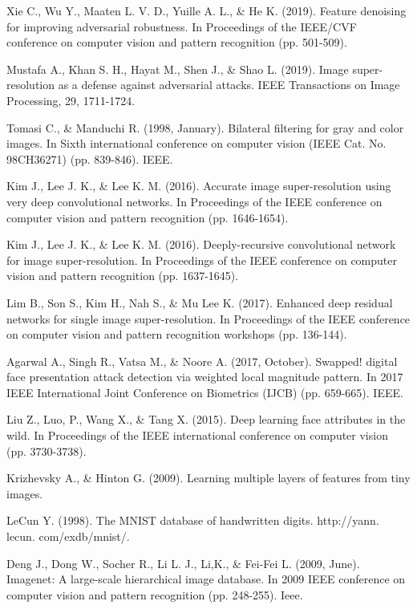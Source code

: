 \begin{thebibliography}{}
Xie C., Wu Y., Maaten L. V. D., Yuille A. L., \& He K. (2019). Feature denoising for improving adversarial robustness. In Proceedings of the IEEE/CVF conference on computer vision and pattern recognition (pp. 501-509).

Mustafa A., Khan S. H., Hayat M., Shen J., \& Shao L. (2019). Image super-resolution as a defense against adversarial attacks. IEEE Transactions on Image Processing, 29, 1711-1724.

Tomasi C., \& Manduchi R. (1998, January). Bilateral filtering for gray and color images. In Sixth international conference on computer vision (IEEE Cat. No. 98CH36271) (pp. 839-846). IEEE.

Kim J., Lee J. K., \& Lee K. M. (2016). Accurate image super-resolution using very deep convolutional networks. In Proceedings of the IEEE conference on computer vision and pattern recognition (pp. 1646-1654).

Kim J., Lee J. K., \& Lee K. M. (2016). Deeply-recursive convolutional network for image super-resolution. In Proceedings of the IEEE conference on computer vision and pattern recognition (pp. 1637-1645).

Lim B., Son S., Kim H., Nah S., \& Mu Lee K. (2017). Enhanced deep residual networks for single image super-resolution. In Proceedings of the IEEE conference on computer vision and pattern recognition workshops (pp. 136-144).

Agarwal A., Singh R., Vatsa M., \& Noore A. (2017, October). Swapped! digital face presentation attack detection via weighted local magnitude pattern. In 2017 IEEE International Joint Conference on Biometrics (IJCB) (pp. 659-665). IEEE.

Liu Z., Luo, P., Wang X., \& Tang X. (2015). Deep learning face attributes in the wild. In Proceedings of the IEEE international conference on computer vision (pp. 3730-3738).

 Krizhevsky A., \& Hinton G. (2009). Learning multiple layers of features from tiny images.
 
LeCun Y. (1998). The MNIST database of handwritten digits. http://yann. lecun. com/exdb/mnist/.

Deng J., Dong W., Socher R., Li L. J., Li,K., \& Fei-Fei L. (2009, June). Imagenet: A large-scale hierarchical image database. In 2009 IEEE conference on computer vision and pattern recognition (pp. 248-255). Ieee.


\end{thebibliography}
